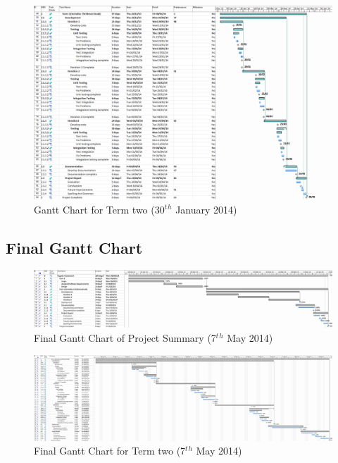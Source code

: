\begin{landscape}
\begin{figure}[H]
  \centering
  \includegraphics[width=\linewidth]{images/gant_chart_interim_term2.png}
  \caption{Gantt Chart for Term two (30$^t$$^h$ January 2014)}
  \label{fig:ganttinterimterm2}
\end{figure}



\subsection{Final Gantt Chart}

\begin{figure}[H]
  \centering
  \includegraphics[width=\linewidth]{images/gant_chart_final_overview.png}
  \caption{Final Gantt Chart of Project Summary (7$^t$$^h$ May 2014)}
  \label{fig:ganttfinaloverview}
\end{figure}

\begin{figure}[H]
  \centering
  \includegraphics[width=\linewidth]{images/gant_chart_final_term2.png}
  \caption{Final Gantt Chart for Term two (7$^t$$^h$ May 2014)}
  \label{fig:ganttfinalterm2}
\end{figure}

\end{landscape}
